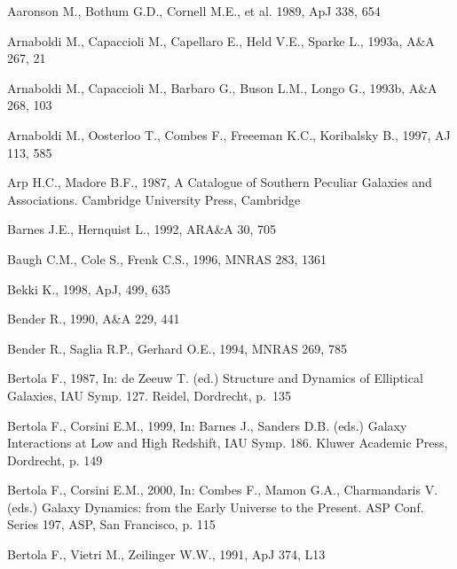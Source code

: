 \documentclass[twocolumns]{aa}
\begin{document}
\begin{thebibliography}{}

 Aaronson M., Bothum G.D., 
  Cornell M.E., et al.
  1989, ApJ 338, 654

 Arnaboldi M., Capaccioli M.,
  Capellaro E., Held V.E., Sparke L., 1993a, A\&A 267, 21

 Arnaboldi M., Capaccioli M., 
  Barbaro G., Buson L.M., Longo G., 1993b, A\&A 268, 103 

 Arnaboldi M., Oosterloo T.,
  Combes F., Freeeman K.C., Koribalsky B., 1997, AJ 113, 585

 Arp H.C., Madore B.F., 1987, A 
  Catalogue of Southern Peculiar Galaxies and Associations. Cambridge
  University Press, Cambridge

 Barnes J.E., Hernquist L., 
  1992, ARA\&A 30, 705 

 Baugh C.M., Cole S., Frenk C.S., 
  1996, MNRAS 283, 1361 

 Bekki K., 1998, ApJ, 499, 635

 Bender R., 1990, A\&A 229, 441

 Bender R., 
  Saglia R.P., Gerhard O.E., 1994, MNRAS 269, 785

 Bertola F., 1987, In:  de Zeeuw T. (ed.)
  Structure and Dynamics of Elliptical Galaxies, IAU Symp. 127.
  Reidel, Dordrecht, p.~135

 Bertola F., Corsini E.M., 
  1999, In: Barnes J., Sanders D.B. (eds.) Galaxy Interactions at Low 
  and High Redshift, IAU Symp. 186. Kluwer Academic Press, 
  Dordrecht, p. 149 

 Bertola F., Corsini E.M., 
  2000, In: Combes F., Mamon G.A., Charmandaris V. (eds.) Galaxy 
  Dynamics: from the Early Universe to the Present. ASP Conf. Series
  197, ASP, San Francisco, p. 115

 Bertola F.,
  Vietri M., Zeilinger W.W., 1991, ApJ 374, L13


\end{thebibliography}
\end{document}
